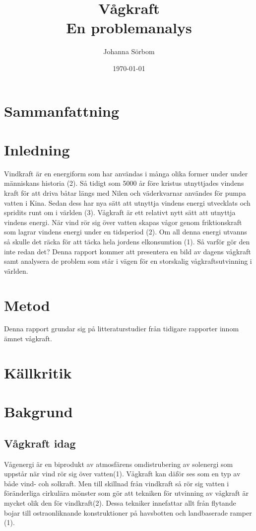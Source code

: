\documentclass[10pt,a4paper,oneside]{article}
\title{Vågkraft \\ 
\large En problemanalys}
\author{\small Johanna Sörbom}
\date{\small \today}
\begin{document}
\maketitle
\newpage

\section{Sammanfattning}
\newpage

\tableofcontents
\newpage

\section{Inledning}
Vindkraft är en energiform som har användas i många olika former under under människans historia (2). Så tidigt som 5000 år före kristus utnyttjades vindens kraft för att driva båtar längs med Nilen och väderkvarnar användes för pumpa vatten i Kina. Sedan dess har nya sätt att utnyttja vindens energi utvecklats och spridits runt om i världen (3). Vågkraft är ett relativt nytt sätt att utnyttja vindens energi. När vind rör sig över vatten skapas vågor genom friktionskraft som lagrar vindens energi under en tidsperiod (2). Om all denna energi utvanns så skulle det räcka för att täcka hela jordens elkonsumtion (1). Så varför gör den inte redan det? Denna rapport kommer att presentera en bild av dagens vågkraft samt analysera de problem som står i vägen för en storskalig vågkraftsutvinning i världen. 
\newpage

\section{Metod}
Denna rapport grundar sig på litteraturstudier från tidigare rapporter innom ämnet vågkraft. 

\section{Källkritik}

\section{Bakgrund}
\subsection{Vågkraft idag}
Vågenergi är en biprodukt av atmosfärens omdistrubering av solenergi som uppstår när vind rör sig över vatten(1). Vågkraft kan däför ses som en typ av både vind- coh solkraft. Men till skillnad från vindkraft så rör sig vatten i föränderliga cirkulära mönster som gör att tekniken för utvinning av vågkraft är mycket olik den för vindkraft(2). Dessa tekniker innefattar allt från flytande bojar till ostraonliknande konstruktioner på havsbotten och landbaserade ramper (1).
\end{document}
